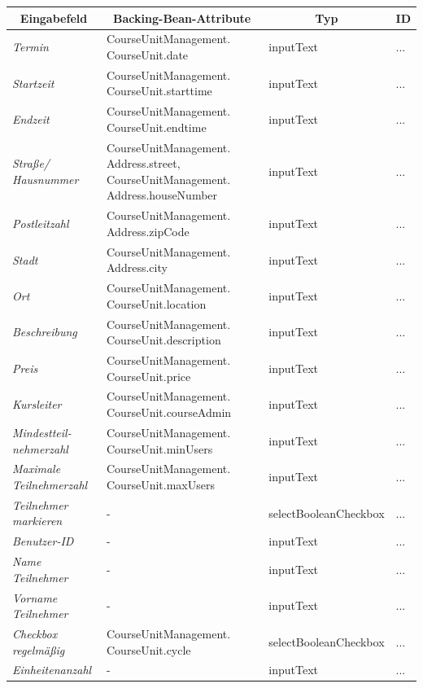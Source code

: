 \begin{itemize}
				\begin{center}
					\begin{longtable}{|p{3cm} |p{5cm} | p{4cm}|p{3cm}|}
						
						\hline \multicolumn{1}{|c|}{\textbf{Eingabefeld}} & \multicolumn{1}{|c|}{\textbf{Backing-Bean-Attribute}} & \multicolumn{1}{|c|}{\textbf{Typ}}  &  \multicolumn{1}{|c|}{\textbf{ID}} \\ \hline
						\endfirsthead
						\hline
						\endlastfoot
						\textit{Termin} & CourseUnitManagement. CourseUnit.date & inputText & ... \\ \hline
						\textit{Startzeit} & CourseUnitManagement. CourseUnit.starttime & inputText & ... \\ \hline
						\textit{Endzeit} & CourseUnitManagement. CourseUnit.endtime & inputText & ... \\ \hline
						\textit{Straße/ Hausnummer} & CourseUnitManagement. Address.street, CourseUnitManagement. Address.houseNumber & inputText & ...\\ \hline
						\textit{Postleitzahl} & CourseUnitManagement. Address.zipCode & inputText & ... \\ \hline
						\textit{Stadt} & CourseUnitManagement. Address.city & inputText & ... \\ \hline
						\textit{Ort} & CourseUnitManagement. CourseUnit.location & inputText & ... \\ \hline
						\textit{Beschreibung} & CourseUnitManagement. CourseUnit.description & inputText & ...\\ \hline
						\textit{Preis} & CourseUnitManagement. CourseUnit.price & inputText & ... \\ \hline
						\textit{Kursleiter} & CourseUnitManagement. CourseUnit.courseAdmin & inputText & ... \\ \hline
						\textit{Mindestteil- nehmerzahl} & CourseUnitManagement. CourseUnit.minUsers & inputText & ... \\ \hline
						\textit{Maximale Teilnehmerzahl} & CourseUnitManagement. CourseUnit.maxUsers & inputText & ... \\ \hline
						\textit{Teilnehmer markieren} & - & selectBooleanCheckbox & ... \\ \hline
						\textit{Benutzer-ID} & - & inputText & ... \\ \hline
						\textit{Name Teilnehmer} & - & inputText & ... \\ \hline
						\textit{Vorname Teilnehmer} & - & inputText & ... \\ \hline
						\textit{Checkbox regelmäßig} & CourseUnitManagement. CourseUnit.cycle & selectBooleanCheckbox & ... \\ \hline
						\textit{Einheitenanzahl} & - & inputText & ... \\ \hline
					\end{longtable}
				\end{center}
				

\end{itemize}

